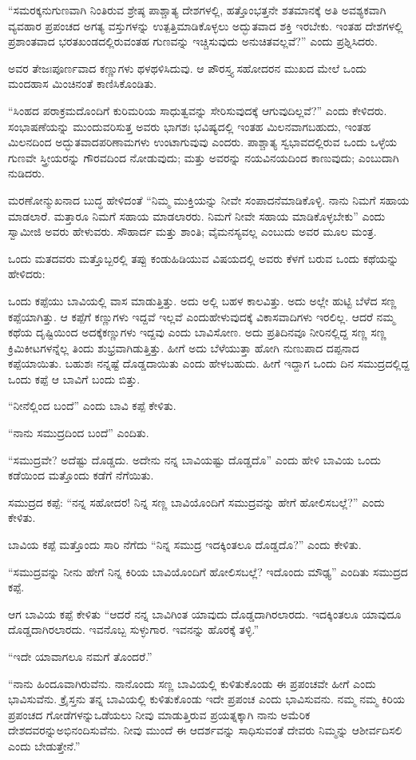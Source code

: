 “ಸಮರಕ್ಕನುಗುಣವಾಗಿ ನಿಂತಿರುವ ಶ್ರೇಷ್ಠ ಪಾಶ್ಚಾತ್ಯ ದೇಶಗಳಲ್ಲಿ, ಹತ್ತೊಂಭತ್ತನೇ ಶತಮಾನಕ್ಕೆ ಅತಿ ಅವಶ್ಯಕವಾಗಿ ವ್ಯವಹಾರ ಪ್ರಪಂಚದ ಅಗತ್ಯ ವಸ್ತುಗಳನ್ನು ಉತ್ಪತ್ತಿಮಾಡಿಕೊಳ್ಳಲು ಅದ್ಭುತವಾದ ಶಕ್ತಿ ಇರಬೇಕು. ಇಂತಹ ದೇಶಗಳಲ್ಲಿ ಪ್ರಶಾಂತವಾದ ಭರತಖಂಡದಲ್ಲಿರುವಂತಹ ಗುಣವನ್ನು ಇಚ್ಚಿಸುವುದು ಅನುಚಿತವಲ್ಲವೆ?” ಎಂದು ಪ್ರಶ್ನಿಸಿದರು.

ಅವರ ತೇಜಃಪೂರ್ಣವಾದ ಕಣ್ಣುಗಳು ಥಳಥಳಿಸಿದುವು. ಆ ಪೌರಸ್ತ್ಯ ಸಹೋದರನ ಮುಖದ ಮೇಲೆ ಒಂದು ಮಂದಹಾಸ ಮಿಂಚಿನಂತೆ ಕಾಣಿಸಿಕೊಂಡಿತು.

“ಸಿಂಹದ ಪರಾಕ್ರಮದೊಂದಿಗೆ ಕುರಿಮರಿಯ ಸಾಧುತ್ವವನ್ನು ಸೇರಿಸುವುದಕ್ಕೆ ಆಗುವುದಿಲ್ಲವೆ?” ಎಂದು ಕೇಳಿದರು. ಸಂಭಾಷಣೆಯನ್ನು ಮುಂದುವರಿಸುತ್ತ ಅವರು ಭಾಗಶಃ ಭವಿಷ್ಯದಲ್ಲಿ ಇಂತಹ ಮಿಲನವಾಗಬಹುದು, ಇಂತಹ ಮಿಲನದಿಂದ ಅದ್ಭುತವಾದ\break ಪರಿಣಾಮಗಳು ಉಂಟಾಗುವುವು ಎಂದರು. ಪಾಶ್ಚಾತ್ಯ ಸ್ವಭಾವದಲ್ಲಿರುವ ಒಂದು ಒಳ್ಳೆಯ ಗುಣವೇ ಸ್ತ್ರೀಯರನ್ನು ಗೌರವದಿಂದ ನೋಡುವುದು; ಮತ್ತು ಅವರನ್ನು ನಯವಿನಯದಿಂದ ಕಾಣುವುದು; ಎಂಬುದಾಗಿ ನುಡಿದರು.

ಮರಣೋನ್ಮುಖನಾದ ಬುದ್ಧ ಹೇಳಿದಂತೆ “ನಿಮ್ಮ ಮುಕ್ತಿಯನ್ನು ನೀವೇ ಸಂಪಾದನೆ\break ಮಾಡಿಕೊಳ್ಳಿ. ನಾನು ನಿಮಗೆ ಸಹಾಯ ಮಾಡಲಾರೆ. ಮತ್ತಾರೂ ನಿಮಗೆ ಸಹಾಯ ಮಾಡಲಾರರು. ನಿಮಗೆ ನೀವೇ ಸಹಾಯ ಮಾಡಿಕೊಳ್ಳಬೇಕು” ಎಂದು ಸ್ವಾಮೀಜಿ ಅವರು ಹೇಳುವರು. ಸೌಹಾರ್ದ ಮತ್ತು ಶಾಂತಿ; ವೈಮನಸ್ಯವಲ್ಲ ಎಂಬುದು ಅವರ ಮೂಲ ಮಂತ್ರ.

ಒಂದು ಮತದವರು ಮತ್ತೊಬ್ಬರಲ್ಲಿ ತಪ್ಪು ಕಂಡುಹಿಡಿಯುವ ವಿಷಯದಲ್ಲಿ ಅವರು ಕೆಳಗೆ ಬರುವ ಒಂದು ಕಥೆಯನ್ನು ಹೇಳಿದರು:

ಒಂದು ಕಪ್ಪೆಯು ಬಾವಿಯಲ್ಲಿ ವಾಸ ಮಾಡುತ್ತಿತ್ತು. ಅದು ಅಲ್ಲಿ ಬಹಳ ಕಾಲವಿತ್ತು. ಅದು ಅಲ್ಲೇ ಹುಟ್ಟಿ ಬೆಳೆದ ಸಣ್ಣ ಕಪ್ಪೆಯಾಗಿತ್ತು. ಆ ಕಪ್ಪೆಗೆ ಕಣ್ಣುಗಳು ಇದ್ದವೆ ಇಲ್ಲವೆ ಎಂದು\break ಹೇಳುವುದಕ್ಕೆ ವಿಕಾಸವಾದಿಗಳು ಇರಲಿಲ್ಲ. ಆದರೆ ನಮ್ಮ ಕಥೆಯ ದೃಷ್ಟಿಯಿಂದ ಅದಕ್ಕೆ\break ಕಣ್ಣುಗಳು ಇದ್ದವು ಎಂದು ಬಾವಿಸೋಣ. ಅದು ಪ್ರತಿದಿನವೂ ನೀರಿನಲ್ಲಿದ್ದ ಸಣ್ಣ ಸಣ್ಣ ಕ್ರಿಮಿಕೀಟಗಳನ್ನೆಲ್ಲ ತಿಂದು ಶುಭ್ರವಾಗಿಡುತ್ತಿತ್ತು. ಹೀಗೆ ಅದು ಬೆಳೆಯುತ್ತಾ ಹೋಗಿ ನುಣುಪಾದ ದಪ್ಪನಾದ ಕಪ್ಪೆಯಾಯಿತು. ಬಹುಶಃ ನನ್ನಷ್ಟೆ ದೊಡ್ಡದಾಯಿತು ಎಂದು ಹೇಳಬಹುದು. ಹೀಗೆ ಇದ್ದಾಗ ಒಂದು ದಿನ ಸಮುದ್ರದಲ್ಲಿದ್ದ ಒಂದು ಕಪ್ಪೆ ಆ ಬಾವಿಗೆ ಬಂದು ಬಿತ್ತು.

“ನೀನೆಲ್ಲಿಂದ ಬಂದೆ” ಎಂದು ಬಾವಿ ಕಪ್ಪೆ ಕೇಳಿತು.

“ನಾನು ಸಮುದ್ರದಿಂದ ಬಂದೆ” ಎಂದಿತು.

“ಸಮುದ್ರವೇ? ಅದೆಷ್ಟು ದೊಡ್ಡದು. ಅದೇನು ನನ್ನ ಬಾವಿಯಷ್ಟು ದೊಡ್ಡದೊ” ಎಂದು ಹೇಳಿ ಬಾವಿಯ ಒಂದು ಕಡೆಯಿಂದ ಮತ್ತೊಂದು ಕಡೆಗೆ ನೆಗೆಯಿತು.

ಸಮುದ್ರದ ಕಪ್ಪೆ: “ನನ್ನ ಸಹೋದರ! ನಿನ್ನ ಸಣ್ಣ ಬಾವಿಯೊಂದಿಗೆ ಸಮುದ್ರವನ್ನು ಹೇಗೆ ಹೋಲಿಸಬಲ್ಲೆ?” ಎಂದು ಕೇಳಿತು.

ಬಾವಿಯ ಕಪ್ಪೆ ಮತ್ತೊಂದು ಸಾರಿ ನೆಗೆದು “ನಿನ್ನ ಸಮುದ್ರ ಇದಕ್ಕಿಂತಲೂ ದೊಡ್ಡದೊ?” ಎಂದು ಕೇಳಿತು.

“ಸಮುದ್ರವನ್ನು ನೀನು ಹೇಗೆ ನಿನ್ನ ಕಿರಿಯ ಬಾವಿಯೊಂದಿಗೆ ಹೋಲಿಸಬಲ್ಲೆ? ಇದೊಂದು ಮೌಢ್ಯ” ಎಂದಿತು ಸಮುದ್ರದ ಕಪ್ಪೆ.

ಆಗ ಬಾವಿಯ ಕಪ್ಪೆ ಕೇಳಿತು “ಆದರೆ ನನ್ನ ಬಾವಿಗಿಂತ ಯಾವುದು ದೊಡ್ಡದಾಗಿರಲಾರದು. ಇದಕ್ಕಿಂತಲೂ ಯಾವುದೂ ದೊಡ್ಡದಾಗಿರಲಾರದು. ಇವನೊಬ್ಬ ಸುಳ್ಳುಗಾರ. ಇವನನ್ನು ಹೊರಕ್ಕೆ ತಳ್ಳಿ.”

“ಇದೇ ಯಾವಾಗಲೂ ನಮಗೆ ತೊಂದರೆ.”

“ನಾನು ಹಿಂದೂವಾಗಿರುವೆನು. ನಾನೊಂದು ಸಣ್ಣ ಬಾವಿಯಲ್ಲಿ ಕುಳಿತುಕೊಂಡು ಈ ಪ್ರಪಂಚವೇ ಹೀಗೆ ಎಂದು ಭಾವಿಸುವೆನು. ಕ್ರೈಸ್ತನು ತನ್ನ ಬಾವಿಯಲ್ಲಿ ಕುಳಿತುಕೊಂಡು ಇದೇ ಪ್ರಪಂಚ ಎಂದು ಭಾವಿಸುವನು. ನಮ್ಮ ನಮ್ಮ ಕಿರಿಯ ಪ್ರಪಂಚದ ಗೋಡೆಗಳನ್ನು\break ಒಡೆಯಲು ನೀವು ಮಾಡುತ್ತಿರುವ ಪ್ರಯತ್ನಕ್ಕಾಗಿ ನಾನು ಅಮೆರಿಕ ದೇಶದವರನ್ನು\break ಅಭಿನಂದಿಸುವೆನು. ನೀವು ಮುಂದೆ ಈ ಆದರ್ಶವನ್ನು ಸಾಧಿಸುವಂತೆ ದೇವರು ನಿಮ್ಮನ್ನು ಆಶೀರ್ವದಿಸಲಿ ಎಂದು ಬೇಡುತ್ತೇನೆ.”

\eject

